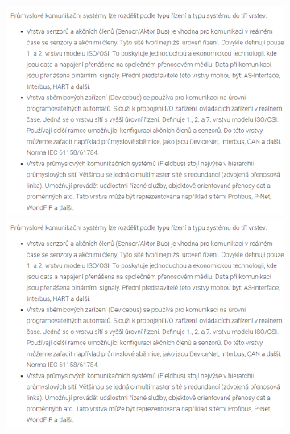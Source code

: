 \begin{figure}[h]
\begin{figure}[!h]
  \begin{center}
    \includegraphics[scale = 1]{img/Picture18.png}
  \end{center}
    \begin{center}
        \includegraphics[scale = 1]{img/Picture18.png}
    \end{center}
\end{figure}

\newpage


\end{figure}
